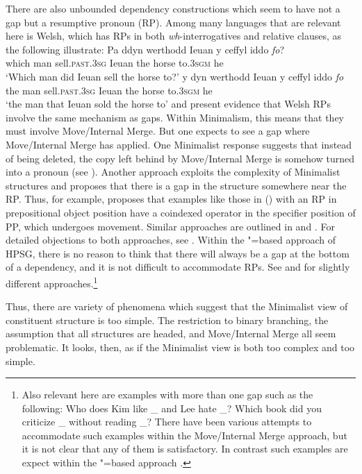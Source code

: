\documentclass[output=paper]{langsci/langscibook}
\begin{document}
There are also unbounded dependency constructions which seem to have not a gap but a resumptive pronoun (RP). Among many languages that are relevant here is Welsh, which has RPs in both \textit{wh}-interrogatives and relative clauses, as the following illustrate:
\eal
\ex
\gll Pa	ddyn werthodd Ieuan y ceffyl iddo \textit{fo}?\\
     which man sell.\textsc{past}.\textsc{3sg} Ieuan the horse to.\textsc{3sgm} he\\
\glt`Which man did Ieuan sell the horse to?'
\ex 
\gll y dyn werthodd Ieuan y ceffyl iddo \textit{fo}\\
the man sell.\textsc{past}.\textsc{3sg} Ieuan the horse to.\textsc{3sgm} he\\
\glt`the man that Ieuan sold the horse to'
\zl
\citet{Willis.2011} and \citet{Borsley.2010,Borsley2013a-u} present evidence that Welsh RPs involve
the same mechanism as gaps. Within Minimalism, this means that they must involve Move/Internal
Merge. But one expects to see a gap where Move/Internal Merge has applied. One Minimalist response
suggests that instead of being deleted, the copy left behind by Move/Internal Merge is somehow
turned into a pronoun (see \citealt{McCloskey.2006}). Another approach exploits the complexity of
Minimalist structures and proposes that there is a gap in the structure somewhere near the RP.
Thus, for example, \citet{Willis.2011} proposes that examples like those in () with an RP in
prepositional object position have a coindexed operator in the specifier position of PP, which
undergoes movement. Similar approaches are outlined in \citet{AounChoueiriHornstein2001a-u} and
\citet{Boeckx.2003}. For detailed objections to both approaches, see
\citet[Section~3]{Borsley2013a-u}. Within the \slasch"=based approach of HPSG, there is no reason to
think that there will always be a gap at the bottom of a dependency, and it is not difficult to
accommodate RPs. See \citet{Borsley2013a-u} and \citet{crysmann_b10fg,Crysmann.2016} for slightly
different approaches.\footnote{%
	Also relevant here are examples with more than one gap such as the following:
	\eal
	\ex	Who does Kim like \_ and Lee hate \_?
	\ex	Which book did you criticize \_ without reading \_?
	\zl
	There have been various attempts to accommodate such examples within the Move/Internal Merge approach, but it is not clear that any of them is satisfactory. In contrast such examples are expect within the \slasch"=based approach \citet{LS2003a-u}.%
}

Thus, there are variety of phenomena which suggest that the Minimalist view of constituent structure is too simple. The restriction to binary branching, the assumption that all structures are headed, and Move/Internal Merge all seem problematic. It looks, then, as if the Minimalist view is both too complex and too simple.
\end{document}
